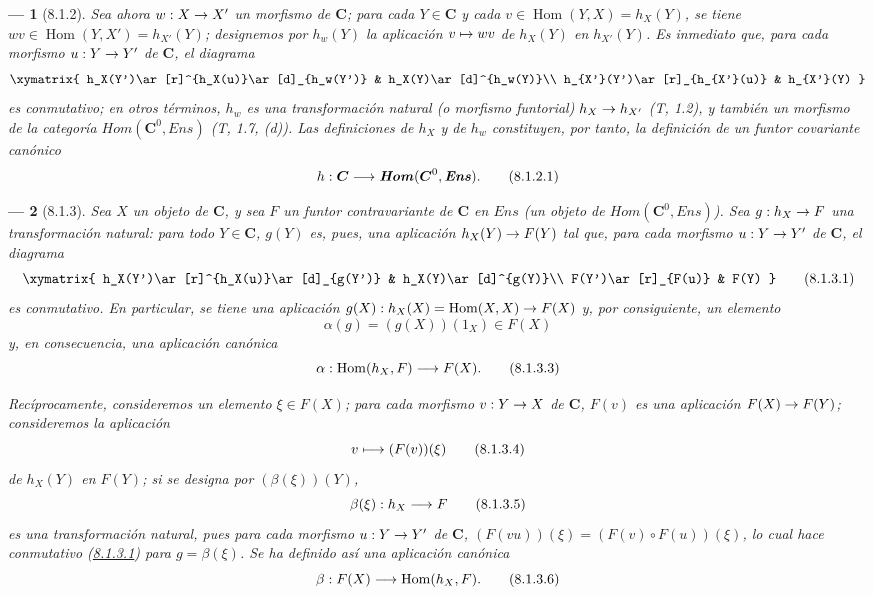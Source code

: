 \documentclass[10pt,oneside,openany]{book}
\makeatletter
\theoremstyle{egaenv}\newtheorem*{env}{---}
\theoremstyle{egastatement}
\theoremstyle{egadescription}
\newcommand{\oldpage}[2][]{\marginnote{\normalfont\scriptsize\textbf{#1}\,|\,#2}\ignorespaces}
\let\ega@shortmapsto\mapsto
\renewcommand{\to}{\mathchoice{\longrightarrow}{\rightarrow}{\rightarrow}{\rightarrow}}
\renewcommand{\mapsto}{\mathchoice{\longmapsto}{\ega@shortmapsto}{\ega@shortmapsto}{\ega@shortmapsto}}
\makeatother
\begin{document}
\begin{env}[8.1.2]
\label{0.8.1.2}
\label{0.8.1.2-fr}
Sea ahora $w:X\to X'$ un morfismo de $\boldsymbol{C}$; para cada $Y\in\boldsymbol{C}$ y cada $v\in\operatorname{Hom}(Y,X)=h_X(Y)$,
se tiene $wv\in\operatorname{Hom}(Y,X')=h_{X'}(Y)$; designemos por $h_w(Y)$ la aplicación $v\mapsto wv$ de
$h_X(Y)$ en $h_{X'}(Y)$. Es inmediato que, para cada morfismo $u:Y\to Y'$ de $\boldsymbol{C}$, el
diagrama
\[
  \xymatrix{
    h_X(Y')\ar[r]^{h_X(u)}\ar[d]_{h_w(Y')} &
    h_X(Y)\ar[d]^{h_w(Y)}\\
    h_{X'}(Y')\ar[r]_{h_{X'}(u)} &
    h_{X'}(Y)
  }
\]
es conmutativo; en otros términos, $h_w$ es una \emph{transformación natural (o morfismo funtorial)
$h_X\to h_{X'}$} (T, 1.2), y también un morfismo de la categoría $\boldsymbol{\mathit{Hom}}(\boldsymbol{C}^0,\boldsymbol{\mathit{Ens}})$ (T, 1.7, (\textit{d})). Las
definiciones de $h_X$ y de $h_w$ constituyen, por tanto, la definición de un \emph{funtor covariante
canónico}
\[
  h:\boldsymbol{C}\to\boldsymbol{\mathit{Hom}}(\boldsymbol{C}^0,\boldsymbol{\mathit{Ens}}).
  \tag{8.1.2.1}
\]
\end{env}

\begin{env}[8.1.3]
\label{0.8.1.3}
\label{0.8.1.3-fr}
Sea $X$ un objeto de $\boldsymbol{C}$, y sea $F$ un funtor contravariante de $\boldsymbol{C}$ en $\boldsymbol{\mathit{Ens}}$
(un objeto de $\boldsymbol{\mathit{Hom}}(\boldsymbol{C}^0,\boldsymbol{\mathit{Ens}})$). Sea $g:h_X\to F$ una \emph{transformación natural}: para todo $Y\in\boldsymbol{C}$,
\oldpage[0\textsubscript{III}]{6}
$g(Y)$ es, pues, una aplicación $h_X(Y)\to F(Y)$ tal que, para cada morfismo $u:Y\to Y'$ de $\boldsymbol{C}$,
el diagrama
\[
  \xymatrix{
    h_X(Y')\ar[r]^{h_X(u)}\ar[d]_{g(Y')} &
    h_X(Y)\ar[d]^{g(Y)}\\
    F(Y')\ar[r]_{F(u)} & F(Y)
  }
  \tag{8.1.3.1}\label{0.8.1.3.1-fr}
\]
es conmutativo. En particular, se tiene una aplicación $g(X):h_X(X)=\operatorname{Hom}(X,X)\to F(X)$ y, por consiguiente, un elemento
\[
  \alpha(g)=(g(X))(1_X)\in F(X)
  \tag{8.1.3.2}
\]
y, en consecuencia, una aplicación canónica
\[
  \alpha:\operatorname{Hom}(h_X,F)\to F(X).
  \tag{8.1.3.3}
\]

Recíprocamente, consideremos un elemento $\xi\in F(X)$; para cada morfismo $v:Y\to X$ de $\boldsymbol{C}$, $F(v)$ es una
aplicación $F(X)\to F(Y)$; consideremos la aplicación
\[
  v\mapsto(F(v))(\xi)
  \tag{8.1.3.4}
\]
de $h_X(Y)$ en $F(Y)$; si se designa por $(\beta(\xi))(Y)$,
\[
  \beta(\xi):h_X\to F
  \tag{8.1.3.5}
\]
es una \emph{transformación natural}, pues para cada morfismo $u:Y\to Y'$ de $\boldsymbol{C}$,
$(F(vu))(\xi)=(F(v)\circ F(u))(\xi)$, lo cual hace conmutativo (\hyperref[0.8.1.3.1]{8.1.3.1}) para $g=\beta(\xi)$.
Se ha definido así una aplicación canónica
\[
  \beta:F(X)\to\operatorname{Hom}(h_X,F).
  \tag{8.1.3.6}
\]
\end{env}
\end{document}

